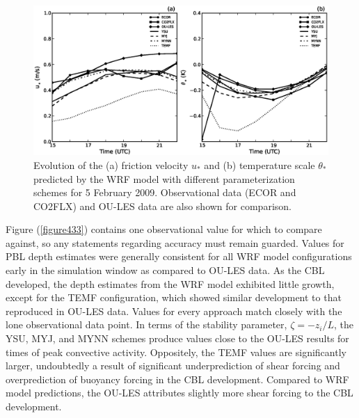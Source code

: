 \begin{figure}[ht!]
\begin{center}
\includegraphics[width=\textwidth]{figures/chapter4/ust_tst_phys_20090205}
\end{center}
\caption{Evolution of the (a) friction velocity $u_*$ and (b) temperature scale $\theta_*$ predicted by the WRF model with different parameterization schemes for 5 February 2009. Observational data (ECOR and CO2FLX) and OU-LES data are also shown for comparison.}
\label{figure432}
\end{figure}


Figure (\autoref{figure433}) contains one observational value for which to compare against, so any statements regarding accuracy must remain guarded. Values for PBL depth estimates were generally consistent for all WRF model configurations early in the simulation window as compared to OU-LES data. As the CBL developed, the depth estimates from the WRF model exhibited little growth, except for the TEMF configuration, which showed similar development to that reproduced in OU-LES data. Values for every approach match closely with the lone observational data point. In terms of the stability parameter, $\zeta = -z_i / L$, the YSU, MYJ, and MYNN schemes produce values close to the OU-LES results for times of peak convective activity. Oppositely, the TEMF values are significantly larger, undoubtedly a result of significant underprediction of shear forcing and overprediction of buoyancy forcing in the CBL development. Compared to WRF model predictions, the OU-LES attributes slightly more shear forcing to the CBL development.


